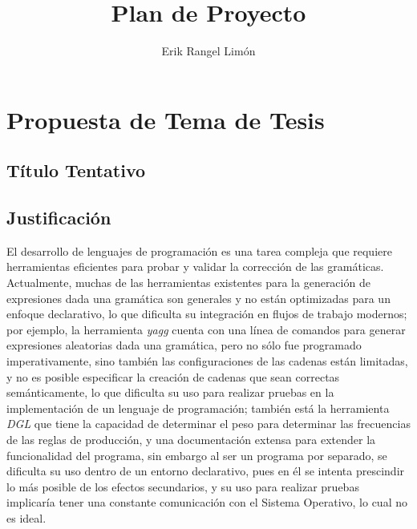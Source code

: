 \documentclass[11pt]{article}
\title{Plan de Proyecto}
\author{Erik Rangel Limón}
\date{}
\begin{document}

\maketitle

\section*{Propuesta de Tema de Tesis}

\subsection*{Título Tentativo}


\subsection*{Justificación}

El desarrollo de lenguajes de programación es una tarea compleja que requiere herramientas eficientes para probar y validar la corrección de las gramáticas. Actualmente, muchas de las herramientas existentes para la generación de expresiones dada una gramática son generales y no están optimizadas para un enfoque declarativo, lo que dificulta su integración en flujos de trabajo modernos; por ejemplo, la herramienta \textit{yagg}\cite{yagg} cuenta con una línea de comandos para generar expresiones aleatorias dada una gramática, pero no sólo fue programado imperativamente, sino también las configuraciones de las cadenas están limitadas, y no es posible especificar la creación de cadenas que sean correctas semánticamente, lo que dificulta su uso para realizar pruebas en la implementación de un lenguaje de programación; también está la herramienta \textit{DGL}\cite{dgl} que tiene la capacidad de determinar el peso para determinar las frecuencias de las reglas de producción, y una documentación extensa para extender la funcionalidad del programa, sin embargo al ser un programa por separado, se dificulta su uso dentro de un entorno declarativo, pues en él se intenta prescindir lo más posible de los efectos secundarios, y su uso para realizar pruebas implicaría tener una constante comunicación con el Sistema Operativo, lo cual no es ideal.
\end{document}
